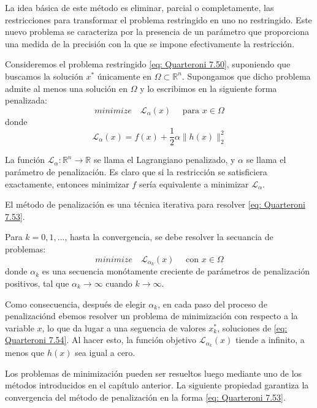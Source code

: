 La idea básica de este método es eliminar, parcial o completamente, las restricciones para transformar el problema restringido en uno no restringido. Este nuevo problema se caracteriza por la presencia de un parámetro que proporciona una medida de la precisión con la que se impone efectivamente la restricción.

Consideremos el problema restringido \ref{eq: Quarteroni 7.50}, suponiendo que buscamos la solución \( x^* \) únicamente en \( \Omega \subset \mathbb{R}^n \). Supongamos que dicho problema admite al menos una solución en \( \Omega \) y lo escribimos en la siguiente forma penalizada:
\begin{equation}
    \label{eq: Quarteroni 7.53}
    minimize \quad \mathcal{L}_\alpha(x) \quad \text{ para } x \in \Omega
\end{equation}
donde
\[ \mathcal{L}_\alpha(x) = f(x) + \frac{1}{2} \alpha \| h(x) \|_2^2 \]

La función \( \mathcal{L}_\alpha : \mathbb{R}^n \to \mathbb{R} \) se llama el Lagrangiano penalizado, y \( \alpha \) se llama el parámetro de penalización. Es claro que si la restricción se satisficiera exactamente, entonces minimizar \( f \) sería equivalente a minimizar \( \mathcal{L}_\alpha \).

El método de penalización es una técnica iterativa para resolver \ref{eq: Quarteroni 7.53}.

Para $k = 0, 1,...$, hasta la convergencia, se debe resolver la secuancia de problemas:
\begin{equation}
    \label{eq: Quarteroni 7.54}
    minimize \quad \mathcal{L}_{\alpha_k}(x) \quad \text{ con } x \in \Omega
\end{equation}
donde ${\alpha_k}$ es una secuencia monótamente creciente de parámetros de penalización positivos, tal que $\alpha_k \rightarrow \infty$ cuando $k \rightarrow \infty$.

Como consecuencia, después de elegir $\alpha_k$, en cada paso del proceso de penalizaciónd ebemos resolver un problema de minimización con respecto a la variable $x$, lo que da lugar a una seguencia de valores $x_k^*$, soluciones de \ref{eq: Quarteroni 7.54}. Al hacer esto, la función objetivo $\mathcal{L}_{\alpha_k} (x)$ tiende a infinito, a menos que $h(x)$ sea igual a cero.

Los problemas de minimización pueden ser resueltos luego mediante uno de los métodos introducidos en el capítulo anterior. La siguiente propiedad garantiza la convergencia del método de penalización en la forma \ref{eq: Quarteroni 7.53}.

